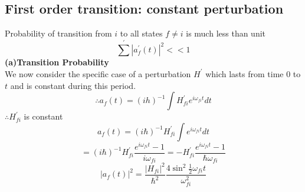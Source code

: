 \subsection{First order transition: constant perturbation }
Probability of transition from $i $ to all states $f\neq i$ is much less than unit
$$ \sum^\prime|a^\prime_f(t)|^2<<1$$
\textbf{(a)\quad Transition Probability }\\
We now consider the specific case of a perturbation $H^\prime$ which lasts from time $0  $ to $t$ and is constant during this period.\\
$$\therefore a_f(t)=(ih)^{-1}\int H^\prime _{fi}e^{i\omega_{fi}t}dt $$ 
$\therefore H^\prime_{fi}$ is constant\\
$$a_f(t)=(i\hbar)^{-1}H^\prime_{fi}\int e^{i\omega_{fi}t}dt$$
$$=(i\hbar)^{-1}H^\prime_{fi}\frac{e^{i\omega_{fi}t}-1}{i\omega_{fi}}=-H^\prime_{fi}\frac{e^{i\omega_{fi}t}-1}{\hbar\omega_{fi}}$$
$$|a_f(t)|^2=\frac{|H_{fi}|^2}{\hbar^2}\frac{4\sin^2\frac{1}{2}\omega_{fi}t}{\omega_{fi}^2}$$


